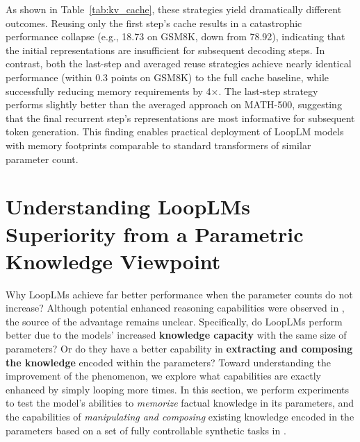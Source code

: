 \documentclass[]{bytedance_seed}
\newcommand{\1}{\mathbf{1}}
\newcommand{\ut}{LoopLM}
\begin{document}
As shown in Table~\ref{tab:kv_cache}, these strategies yield dramatically different outcomes. Reusing only the first step's cache results in a catastrophic performance collapse (e.g., 18.73 on GSM8K, down from 78.92), indicating that the initial representations are insufficient for subsequent decoding steps. In contrast, both the last-step and averaged reuse strategies achieve nearly identical performance (within 0.3 points on GSM8K) to the full cache baseline, while successfully reducing memory requirements by 4×. The last-step strategy performs slightly better than the averaged approach on MATH-500, suggesting that the final recurrent step's representations are most informative for subsequent token generation. This finding enables practical deployment of \ut{} models with memory footprints comparable to standard transformers of similar parameter count.

\section{Understanding \ut{}s Superiority from a Parametric Knowledge Viewpoint}
\label{sec:understanding_ut}
Why \ut{}s achieve far better performance when the parameter counts do not increase? Although potential enhanced reasoning capabilities were observed in \cite{saunshi2025reasoning}, the source of the advantage remains unclear. Specifically, do \ut{}s perform better due to the models' increased \textbf{knowledge capacity} with the same size of parameters? Or do they have a better capability in \textbf{extracting and composing the knowledge} encoded within the parameters? Toward understanding the improvement of the phenomenon, we explore what capabilities are exactly enhanced by simply looping more times. 
In this section, we perform experiments to test the model's abilities to \textit{memorize} factual knowledge in its parameters, and the capabilities of \textit{manipulating and composing} existing knowledge encoded in the parameters based on a set of fully controllable synthetic tasks in \cite{AL2024-knowledge3,Allenzhu2025-canon,yao2025language}.

\end{document}
